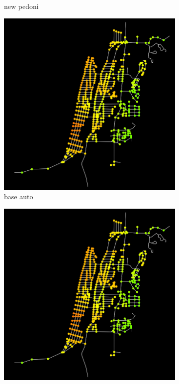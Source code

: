 \begin{figure}
\begin{subfigure}{0.475\textwidth}
        \caption{new pedoni}
    \end{subfigure}
    \hfill
    \begin{subfigure}{0.475\textwidth}
        \centering
        \includegraphics[width=\textwidth]{images/analisi/comparison-ev-times-map-base-car.png}
        \caption{base auto}
    \end{subfigure}
    \hfill
    \begin{subfigure}{0.475\textwidth}
        \centering
        \includegraphics[width=\textwidth]{images/analisi/comparison-ev-times-map-new-car.png}

\end{subfigure}
\end{figure}
